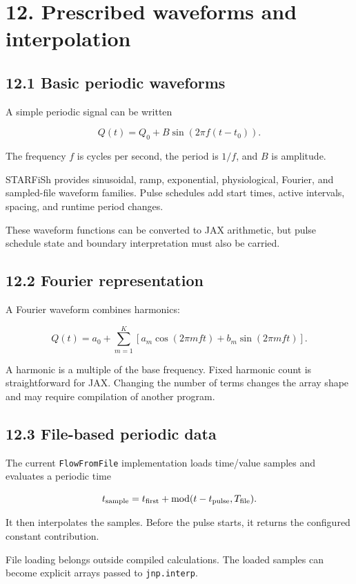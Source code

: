 \documentclass[11pt,a4paper]{article}
\begin{document}
\clearpage
\section{12. Prescribed waveforms and interpolation}
\subsection{12.1 Basic periodic waveforms}
A simple periodic signal can be written


\begingroup\small
\[
Q(t)=Q_0+B\sin(2\pi f(t-t_0)).
\]
\endgroup


The frequency \(f\) is cycles per second, the period is \(1/f\), and \(B\) is amplitude.

STARFiSh provides sinusoidal, ramp, exponential, physiological, Fourier, and sampled-file waveform families. Pulse schedules add start times, active intervals, spacing, and runtime period changes.

These waveform functions can be converted to JAX arithmetic, but pulse schedule state and boundary interpretation must also be carried.

\subsection{12.2 Fourier representation}
A Fourier waveform combines harmonics:


\begingroup\small
\[
Q(t)=a_0+\sum_{m=1}^{K}
\left[a_m\cos(2\pi mf t)+b_m\sin(2\pi mf t)\right].
\]
\endgroup


A harmonic is a multiple of the base frequency. Fixed harmonic count is straightforward for JAX. Changing the number of terms changes the array shape and may require compilation of another program.

\subsection{12.3 File-based periodic data}
The current \texttt{FlowFromFile} implementation loads time/value samples and evaluates a periodic time


\begingroup\small
\[
t_{\rm sample}
=t_{\rm first}
+\operatorname{mod}(t-t_{\rm pulse},T_{\rm file}).
\]
\endgroup


It then interpolates the samples. Before the pulse starts, it returns the configured constant contribution.

File loading belongs outside compiled calculations. The loaded samples can become explicit arrays passed to \texttt{jnp.\allowbreak{}interp}.
\end{document}
